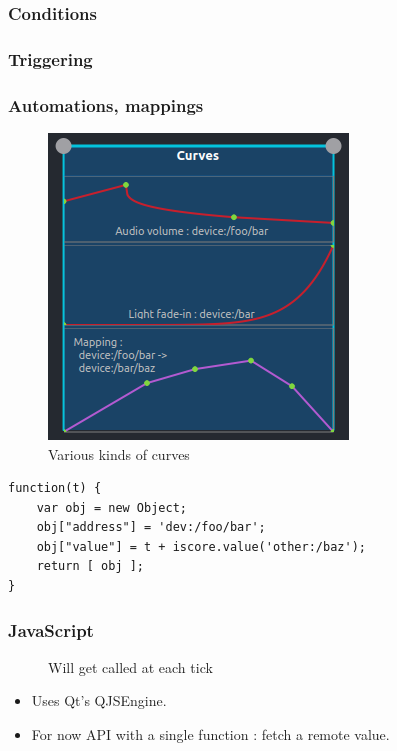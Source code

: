 \documentclass{beamer}
\begin{document}
    
    \begin{frame}
        \frametitle{Conditions}
        \begin{figure}
            \centering{}
        \end{figure}    
    \end{frame}
    
    \begin{frame}
        \frametitle{Triggering}
        \begin{figure}
            \centering{}
        \end{figure}    
    \end{frame}
    
    \begin{frame}
        \frametitle{Automations, mappings}
        \begin{figure}
        	\centering
        	\includegraphics[scale=0.7]{images/curves.png}
        	\caption{Various kinds of curves}
        \end{figure}    
    \end{frame}
    
    \begin{lrbox}{\codebox}
    	\begin{lstlisting}
function(t) { 
    var obj = new Object; 
    obj["address"] = 'dev:/foo/bar'; 
    obj["value"] = t + iscore.value('other:/baz'); 
    return [ obj ]; 
}
    	\end{lstlisting}
    \end{lrbox}
    
    \begin{frame}
    	\frametitle{JavaScript}
    	\begin{figure}
    		\centering
    	    \usebox{\codebox}
    	    \caption{Will get called at each tick}
    	\end{figure}
    	
    	\begin{itemize}
    		\item Uses Qt's QJSEngine.
    		\item For now API with a single function : fetch a remote value.
    	\end{itemize}
    \end{frame}
    
\end{document}
